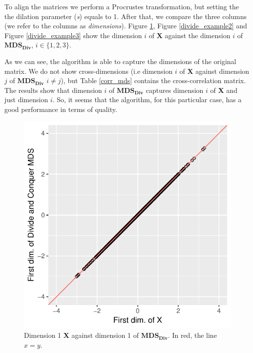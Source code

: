 \documentclass[11pt]{report}
\begin{document}
\indent To align the matrices we perform a Procrustes transformation, but 
setting the the dilation parameter (\textit{s}) equals to 1. 
After that, we compare the three columns (we refer to the columns as 
\textit{dimensions}). Figure \ref{divide_example1}, Figure \ref{divide_example2} 
and Figure \ref{divide_example3}  show the dimension
$i$ of \textbf{X} against the dimension $i$ of $\mathbf{MDS_{Div}}$, 
$i \in \{1,2,3\}$. 

\indent As we can see, the algorithm is able to capture the dimensions of the 
original matrix. We do not show cross-dimensions (i.e dimension $i$ of \textbf{X}
against dimension $j$ of $\mathbf{MDS_{Div}}$ $ i \neq j$), but Table 
\ref{corr_mds} contains the cross-correlation matrix. The results 
show that dimension  $i$ of  $\mathbf{MDS_{Div}}$ captures dimension 
$i$ of \textbf{X} and just dimension $i$. So, it seems that the algorithm, for 
this particular case, has a good performance in terms of quality.



\begin{figure}
    \centering
    \includegraphics[scale = 1]{./images/first_div.pdf}
    \caption{Dimension 1 \textbf{X} against dimension 1 of $\mathbf{MDS_{Div}}$. In red, the line $x=y$.}
    \label{divide_example1}
\end{figure}
\end{document}
